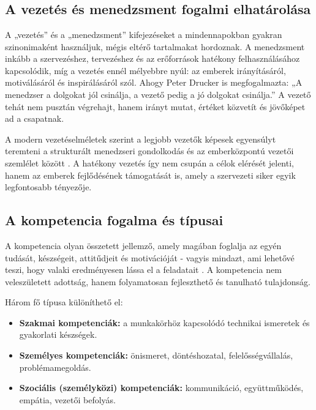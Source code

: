 \chapter{\Literature}
\section{A vezetés és menedzsment fogalmi elhatárolása}

A „vezetés” és a „menedzsment” kifejezéseket a mindennapokban gyakran szinonimaként használjuk, 
mégis eltérő tartalmakat hordoznak. 
A menedzsment inkább a szervezéshez, tervezéshez és az erőforrások hatékony felhasználásához kapcsolódik, 
míg a vezetés ennél mélyebbre nyúl: az emberek irányításáról, motiválásáról és inspirálásáról szól.
Ahogy Peter Drucker is megfogalmazta: 
„A menedzser a dolgokat jól csinálja, a vezető pedig a jó dolgokat csinálja.” \cite{drucker1954}
A vezető tehát nem pusztán végrehajt, hanem irányt mutat, értéket közvetít és jövőképet ad a csapatnak. 

A modern vezetéselméletek szerint a legjobb vezetők képesek egyensúlyt teremteni a strukturált 
menedzseri gondolkodás és az emberközpontú vezetői szemlélet között \cite{mintzberg1975}. 
A hatékony vezetés így nem csupán a célok elérését jelenti, hanem az emberek fejlődésének támogatását is, 
amely a szervezeti siker egyik legfontosabb tényezője.

\section{A kompetencia fogalma és típusai}

A kompetencia olyan összetett jellemző, amely magában foglalja az egyén tudását, 
készségeit, attitűdjeit és motivációját - vagyis mindazt, ami lehetővé teszi, 
hogy valaki eredményesen lássa el a feladatait \cite{spencer1993}. 
A kompetencia nem veleszületett adottság, hanem folyamatosan fejleszthető és tanulható tulajdonság.

Három fő típusa különíthető el:

\begin{itemize}
    \item \textbf{Szakmai kompetenciák:} a munkakörhöz kapcsolódó technikai ismeretek és gyakorlati készségek.
    \item \textbf{Személyes kompetenciák:} önismeret, döntéshozatal, felelősségvállalás, problémamegoldás.
    \item \textbf{Szociális (személyközi) kompetenciák:} kommunikáció, együttműködés, empátia, vezetői befolyás.
\end{itemize}

